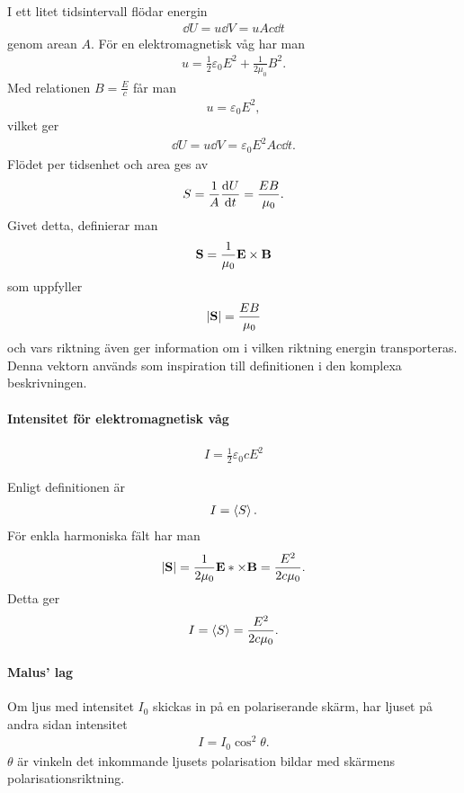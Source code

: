 \deriv
I ett litet tidsintervall flödar energin
\begin{align*}
	\dd{U} = u\dd{V} = uAc\dd{t}
\end{align*}
genom arean $A$. För en elektromagnetisk våg har man
\begin{align*}
	u = \frac{1}{2}\varepsilon_0E^2 + \frac{1}{2\mu_0}B^2.
\end{align*}
Med relationen $B = \frac{E}{c}$ får man
\begin{align*}
	u = \varepsilon_0E^2,
\end{align*}
vilket ger
\begin{align*}
	\dd{U} = u\dd{V} = \varepsilon_0E^2Ac\dd{t}.
\end{align*}
Flödet per tidsenhet och area ges av
\begin{align*}
	S = \frac{1}{A}\dv{U}{t} = \frac{EB}{\mu_0}.
\end{align*}
Givet detta, definierar man
\begin{align*}
	\vect{S} = \frac{1}{\mu_0}\vect{E}\times\vect{B}
\end{align*}
som uppfyller
\begin{align*}
	\abs{\vect{S}} = \frac{EB}{\mu_0}
\end{align*}
och vars riktning även ger information om i vilken riktning energin transporteras. Denna vektorn används som inspiration till definitionen i den komplexa beskrivningen.

\paragraph{Intensitet för elektromagnetisk våg}
\begin{align*}
	I = \frac{1}{2}\varepsilon_0cE^2
\end{align*}

\deriv
Enligt definitionen är
\begin{align*}
	I = \expval{S}.
\end{align*}
För enkla harmoniska fält har man
\begin{align*}
	\abs{\vect{S}} = \frac{1}{2\mu_0}\vect{E}*\times\vect{B} = \frac{E^2}{2c\mu_0}.
\end{align*}
Detta ger
\begin{align*}
	I = \expval{S} = \frac{E^2}{2c\mu_0}.
\end{align*}

\paragraph{Malus' lag}
Om ljus med intensitet $I_0$ skickas in på en polariserande skärm, har ljuset på andra sidan intensitet
\begin{align*}
	I = I_0\cos^2{\theta}.
\end{align*}
$\theta$ är vinkeln det inkommande ljusets polarisation bildar med skärmens polarisationsriktning.

